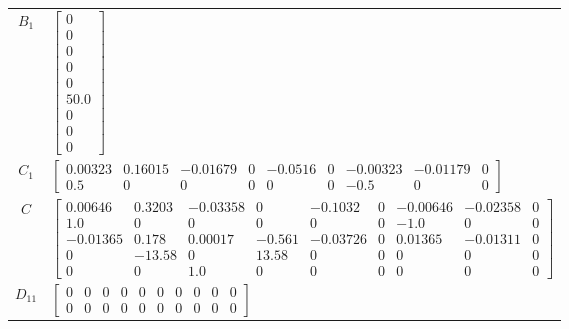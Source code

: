 \begin{tabular}{cl}
 $B_{1}$  & $\left[\begin{matrix}0\\0\\0\\0\\0\\50.0\\0\\0\\0\end{matrix}\right]$                                                                                                                                                                                                                                                                                                                                                                                                                                                                 \\
 $C_{1}$  & $\left[\begin{matrix}0.00323 & 0.16015 & -0.01679 & 0 & -0.0516 & 0 & -0.00323 & -0.01179 & 0\\0.5 & 0 & 0 & 0 & 0 & 0 & -0.5 & 0 & 0\end{matrix}\right]$                                                                                                                                                                                                                                                                                                                                                                             \\
   $C$    & $\left[\begin{matrix}0.00646 & 0.3203 & -0.03358 & 0 & -0.1032 & 0 & -0.00646 & -0.02358 & 0\\1.0 & 0 & 0 & 0 & 0 & 0 & -1.0 & 0 & 0\\-0.01365 & 0.178 & 0.00017 & -0.561 & -0.03726 & 0 & 0.01365 & -0.01311 & 0\\0 & -13.58 & 0 & 13.58 & 0 & 0 & 0 & 0 & 0\\0 & 0 & 1.0 & 0 & 0 & 0 & 0 & 0 & 0\end{matrix}\right]$                                                                                                                                                                                                                \\
 $D_{11}$ & $\left[\begin{matrix}0 & 0 & 0 & 0 & 0 & 0 & 0 & 0 & 0 & 0\\0 & 0 & 0 & 0 & 0 & 0 & 0 & 0 & 0 & 0\end{matrix}\right]$                                                                                                                                                                                                                                                                                                                                                                                                                 \\

\end{tabular}
